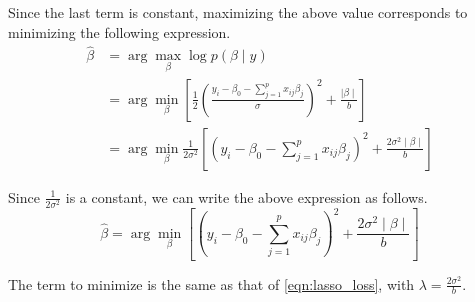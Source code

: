 \documentclass{article}
\begin{document}
Since the last term is constant, maximizing the above value corresponds to minimizing the following expression. 
\begin{equation}
\begin{split}
    \hat{\beta} &= \arg \max_\beta \log p\left(\beta \mid y \right) \\
        &= \arg \min_\beta \left[ \frac{1}{2} \left(\frac{y_i - \beta_0 - \sum_{j=1}^{p} x_{ij} \beta_j}{\sigma}\right)^2 +\frac{\mid \beta \mid}{b}\right] \\
        &= \arg \min_\beta \frac{1}{2 \sigma^2} \left[ \left(y_i - \beta_0 - \sum_{j=1}^{p} x_{ij} \beta_j\right)^2 +\frac{2 \sigma^2 \mid \beta \mid}{b} \right]
\end{split}
\end{equation}

Since $\frac{1}{2 \sigma^2}$ is a constant, we can write the above expression as follows.
\[
    \hat{\beta} = \arg \min_\beta \left[\left(y_i - \beta_0 - \sum_{j=1}^{p} x_{ij} \beta_j\right)^2 +\frac{2 \sigma^2 \mid \beta \mid}{b} \right]
\]

The term to minimize is the same as that of \cref{eqn:lasso_loss}, with $\lambda = \frac{2\sigma^2}{b}$.


\clearpage

% 
% 

\end{document}
